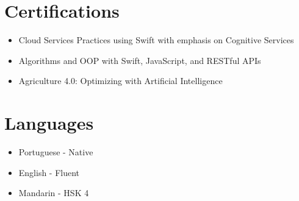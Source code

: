 \documentclass[a4paper,10pt]{article}
\begin{document}
\section*{ Certifications}
\begin{itemize}[label=]
    \item Cloud Services Practices using Swift with emphasis on Cognitive Services
    \item Algorithms and OOP with Swift, JavaScript, and RESTful APIs
    \item Agriculture 4.0: Optimizing with Artificial Intelligence
\end{itemize}

\section*{ Languages}
\begin{itemize}[label=]
    \item Portuguese - Native
    \item English - Fluent
    \item Mandarin - HSK 4
\end{itemize}
\end{document}
